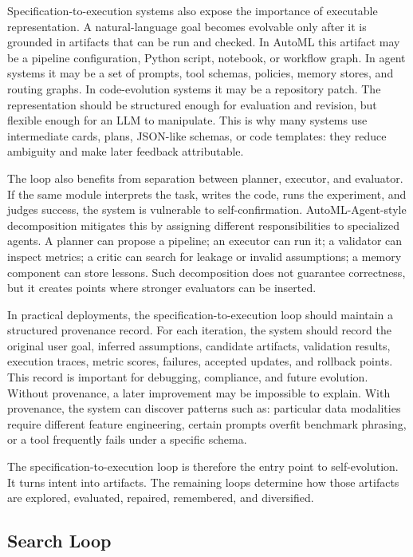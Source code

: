 Specification-to-execution systems also expose the importance of executable representation.  A natural-language goal becomes evolvable only after it is grounded in artifacts that can be run and checked.  In AutoML this artifact may be a pipeline configuration, Python script, notebook, or workflow graph.  In agent systems it may be a set of prompts, tool schemas, policies, memory stores, and routing graphs.  In code-evolution systems it may be a repository patch.  The representation should be structured enough for evaluation and revision, but flexible enough for an LLM to manipulate.  This is why many systems use intermediate cards, plans, JSON-like schemas, or code templates: they reduce ambiguity and make later feedback attributable.

The loop also benefits from separation between planner, executor, and evaluator.  If the same module interprets the task, writes the code, runs the experiment, and judges success, the system is vulnerable to self-confirmation.  AutoML-Agent-style decomposition mitigates this by assigning different responsibilities to specialized agents.  A planner can propose a pipeline; an executor can run it; a validator can inspect metrics; a critic can search for leakage or invalid assumptions; a memory component can store lessons.  Such decomposition does not guarantee correctness, but it creates points where stronger evaluators can be inserted.

In practical deployments, the specification-to-execution loop should maintain a structured provenance record.  For each iteration, the system should record the original user goal, inferred assumptions, candidate artifacts, validation results, execution traces, metric scores, failures, accepted updates, and rollback points.  This record is important for debugging, compliance, and future evolution.  Without provenance, a later improvement may be impossible to explain.  With provenance, the system can discover patterns such as: particular data modalities require different feature engineering, certain prompts overfit benchmark phrasing, or a tool frequently fails under a specific schema.

The specification-to-execution loop is therefore the entry point to self-evolution.  It turns intent into artifacts.  The remaining loops determine how those artifacts are explored, evaluated, repaired, remembered, and diversified.

\subsection{Search Loop}
\label{subsec:taxonomy-search}


